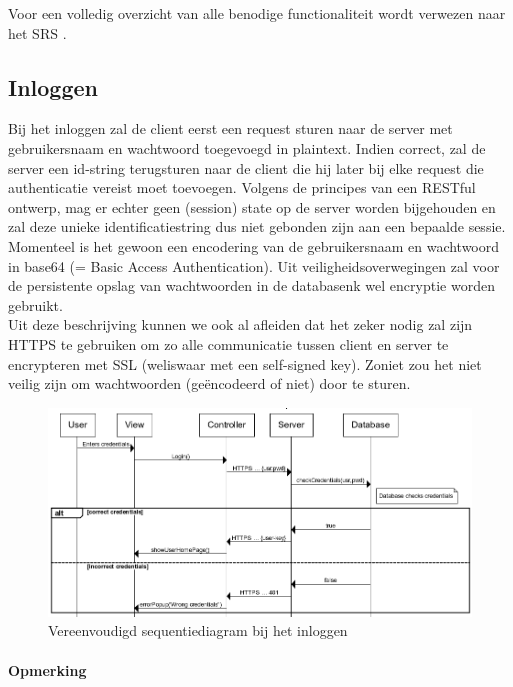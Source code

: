 \documentclass{article}
\begin{document}
Voor een volledig overzicht van alle benodige functionaliteit wordt verwezen naar het SRS \cite{Xtreport:SRS}.

\subsection{Inloggen}

Bij het inloggen zal de client eerst een request sturen naar de server met gebruikersnaam en wachtwoord toegevoegd in plaintext. Indien correct, zal de server een id-string terugsturen naar de client die hij later bij elke request die authenticatie vereist moet toevoegen. Volgens de principes van een RESTful ontwerp, mag er echter geen (session) state op de server worden bijgehouden en zal deze unieke identificatiestring dus niet gebonden zijn aan een bepaalde sessie. Momenteel is het gewoon een encodering van de gebruikersnaam en wachtwoord in base64 (= Basic Access Authentication).
Uit veiligheidsoverwegingen zal voor de persistente opslag van wachtwoorden in de databasenk wel encryptie worden gebruikt. \\ 

Uit deze beschrijving kunnen we ook al afleiden dat het zeker nodig zal zijn HTTPS te gebruiken om zo alle communicatie tussen client en server te encrypteren met SSL (weliswaar met een self-signed key). Zoniet zou het niet veilig zijn om wachtwoorden (ge\"encodeerd of niet) door te sturen.

\begin{figure}[!h]
\centering
 \includegraphics[width=145mm]{login-sequence.png}
 \caption{Vereenvoudigd sequentiediagram bij het inloggen}
 \label{login-sequence}
\end{figure}

\paragraph{Opmerking}
\end{document}

